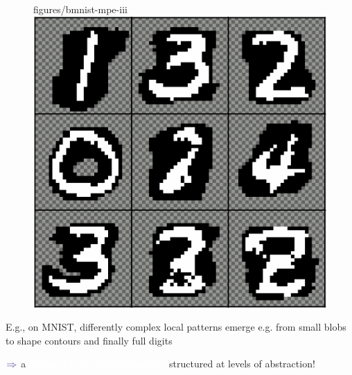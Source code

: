 \documentclass[xcolor={usenames,dvipsnames,svgnames}, compress]{beamer}
\newcommand{\highlighttext}[2][yellow]{{\colorbox{#1}{\textcolor{white}{#2}}}}
\begin{document}
\begin{frame}[t]
\begin{figure}[!t]
    {figures/bmnist-mpe-iii} \label{fig:bmnist-mpe-iii}\hspace{6pt}
    \includegraphics[width=0.18\columnwidth]
    {figures/bmnist-mpe-iiii} \label{fig:bmnist-mpe-iiii}%

  \end{figure}
E.g., on MNIST, differently complex local patterns emerge
e.g. from small blobs to shape contours and finally full digits\par
\hfill\begin{minipage}{1.0\linewidth}
  \vspace{2pt}
      \raggedleft
      $\color{violet}\boldsymbol\Rightarrow$
a \highlighttext[tomato0]{\emph{\textbf{hierarchy of representations}}}
  structured at levels of abstraction!
\end{minipage}
\end{frame}
\end{document}
